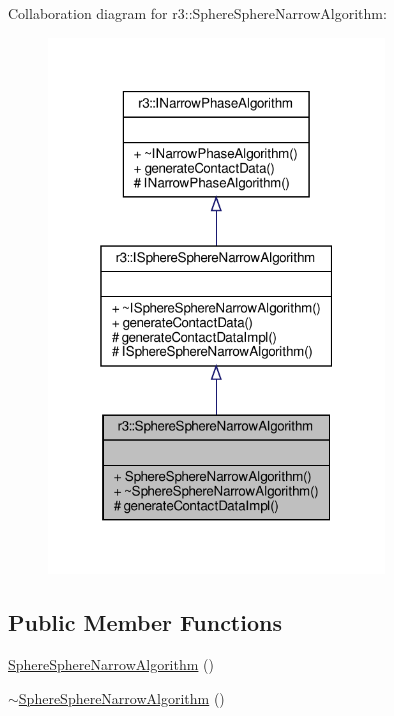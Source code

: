 Collaboration diagram for r3\+:\+:Sphere\+Sphere\+Narrow\+Algorithm\+:\nopagebreak
\begin{figure}[H]
\begin{center}
\leavevmode
\includegraphics[width=253pt]{classr3_1_1_sphere_sphere_narrow_algorithm__coll__graph}
\end{center}
\end{figure}
\subsection*{Public Member Functions}
\begin{DoxyCompactItemize}
\item 
\mbox{\hyperlink{classr3_1_1_sphere_sphere_narrow_algorithm_a502f461be63a812401d8d31cf094a143}{Sphere\+Sphere\+Narrow\+Algorithm}} ()
\item 
\mbox{\hyperlink{classr3_1_1_sphere_sphere_narrow_algorithm_a365b1ed48fff669c4a5b700f3dd7d30c}{$\sim$\+Sphere\+Sphere\+Narrow\+Algorithm}} ()
\end{DoxyCompactItemize}
